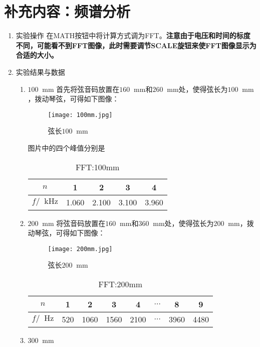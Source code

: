 \documentclass[11pt]{article}
\newcommand*{\unit}[1]{\mathop{}\!\mathrm{#1}}
\newcommand{\mm}{\unit{mm}}
\begin{document}
\section{补充内容：频谱分析}
\begin{enumerate}
	\item 实验操作 \newline
	在MATH按钮中将计算方式调为FFT。\textbf{注意由于电压和时间的标度不同，可能看不到FFT图像，此时需要调节SCALE旋钮来使FFT图像显示为合适的大小。}
	\item 实验结果与数据 
	\begin{enumerate}
		\item \(100\mm\)  \newline	首先将弦音码放置在\(160\unit{mm}\)和\(260\mm\)处，使得弦长为\(100\mm\)，拨动琴弦，可得如下图像：	
		\begin{figure}[H]
			\centering
			\texttt{[image: 100mm.jpg]}
			\caption{弦长\(100\mm\)}
			\label{fig:100mm}
		\end{figure}
		图片中的四个峰值分别是
		\begin{table}[H]
			\centering
			\begin{tabular}{|c|c|c|c|c|}
				\hline
				\(n\) & 1     & 2     & 3     & 4     \\ \hline
				\(f/\unit{kHz}\) & 1.060 & 2.100 & 3.100 & 3.960 \\ \hline
			\end{tabular}
			\caption{FFT:100mm}
			\label{tab:FFT:100mm}
		\end{table}
		\item \(200\mm\)  \newline
		将弦音码放置在\(160\unit{mm}\)和\(360\mm\)处，使得弦长为\(200\mm\)，拨动琴弦，可得如下图像：
		\begin{figure}[H]
			\centering
			\texttt{[image: 200mm.jpg]}
			\caption{弦长\(200\mm\)}
			\label{fig:200mm}
		\end{figure}	
		\begin{table}[H]
			\centering
			\begin{tabular}{|c|c|c|c|c|c|c|c|}
				\hline
				\(n\) & 1     & 2     & 3     & 4	& \(\dots\) & 8     & 9     \\ \hline
				\(f/\unit{Hz}\) & 520 & 1060 & 1560 & 2100 & \(\dots\) & 3960 & 4480 \\ \hline
			\end{tabular}
			\caption{FFT:200mm}
			\label{FFT:200mm}
		\end{table}
		\item \(300\mm\)  \newline

\end{enumerate}
\end{enumerate}
\end{document}
